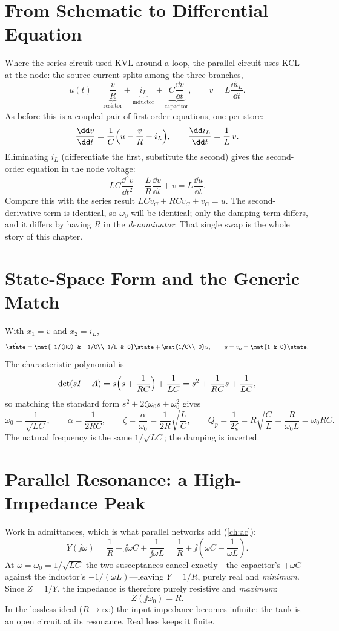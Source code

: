 \section{From Schematic to Differential Equation}
Where the series circuit used KVL around a loop, the parallel circuit uses KCL at
the node: the source current splits among the three branches,
\[
u(t)=\underbrace{\frac{v}{R}}_{\text{resistor}}
+\underbrace{i_L}_{\text{inductor}}
+\underbrace{C\frac{\dd v}{\dd t}}_{\text{capacitor}},
\qquad
v=L\frac{\dd i_L}{\dd t}.
\]
As before this is a coupled pair of first-order equations, one per store:
\[
\frac{\dd v}{\dd t}=\frac{1}{C}\Bigl(u-\frac{v}{R}-i_L\Bigr),
\qquad
\frac{\dd i_L}{\dd t}=\frac{1}{L}\,v .
\]
Eliminating \(i_L\) (differentiate the first, substitute the second) gives the
second-order equation in the node voltage:
\[
\boxed{\,LC\frac{\dd^2 v}{\dd t^2}+\frac{L}{R}\frac{\dd v}{\dd t}+v
=L\frac{\dd u}{\dd t}.\,}
\]
Compare this with the series result \(LC\ddot v_C+RC\dot v_C+v_C=u\). The
second-derivative term is identical, so \(\omega_0\) will be identical; only the
damping term differs, and it differs by having \(R\) in the \emph{denominator}.
That single swap is the whole story of this chapter.

\section{State-Space Form and the Generic Match}
With \(x_1=v\) and \(x_2=i_L\),
\[
\dot{\state}=
\mat{-1/(RC) & -1/C\\ 1/L & 0}\state
+\mat{1/C\\ 0}u,
\qquad
y=v_o=\mat{1 & 0}\state .
\]
The characteristic polynomial is
\[
\det(sI-A)=s\Bigl(s+\frac{1}{RC}\Bigr)+\frac{1}{LC}
=s^2+\frac{1}{RC}s+\frac{1}{LC},
\]
so matching the standard form \(s^2+2\zeta\omega_0 s+\omega_0^2\) gives
\[
\omega_0=\frac{1}{\sqrt{LC}},
\qquad
\alpha=\frac{1}{2RC},
\qquad
\zeta=\frac{\alpha}{\omega_0}=\frac{1}{2R}\sqrt{\frac{L}{C}},
\qquad
Q_p=\frac{1}{2\zeta}=R\sqrt{\frac{C}{L}}=\frac{R}{\omega_0 L}=\omega_0 RC .
\]
The natural frequency is the same \(1/\sqrt{LC}\); the damping is inverted.

\section{Parallel Resonance: a High-Impedance Peak}
Work in admittances, which is what parallel networks add (\cref{ch:ac}):
\[
Y(\jj\omega)=\frac{1}{R}+\jj\omega C+\frac{1}{\jj\omega L}
=\frac{1}{R}+\jj\left(\omega C-\frac{1}{\omega L}\right).
\]
At \(\omega=\omega_0=1/\sqrt{LC}\) the two susceptances cancel exactly---the
capacitor's \(+\omega C\) against the inductor's \(-1/(\omega L)\)---leaving
\(Y=1/R\), purely real and \emph{minimum}. Since \(Z=1/Y\), the impedance is
therefore purely resistive and \emph{maximum}:
\[
Z(\jj\omega_0)=R .
\]
In the lossless ideal (\(R\to\infty\)) the input impedance becomes infinite: the
tank is an open circuit at its resonance. Real loss keeps it finite.


